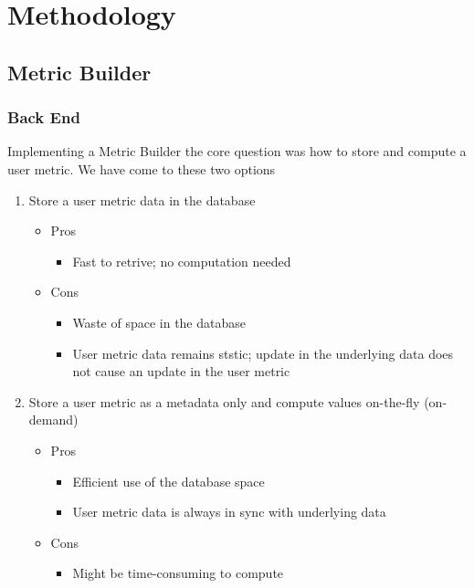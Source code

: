 \chapter{Methodology}

	\section{Metric Builder}

		\subsection{Back End}

			Implementing a Metric Builder the core question was how to store and compute a user metric.
			We have come to these two options

			\begin{enumerate}
				\item
					Store a user metric data in the database
					\begin{itemize}
						\item
							Pros
							\begin{itemize}
								\item
									Fast to retrive;
									no computation needed
							\end{itemize}
						\item
							Cons
							\begin{itemize}
								\item
									Waste of space in the database
								\item
									User metric data remains ststic;
									update in the underlying data does not cause an update in the user metric
							\end{itemize}
					\end{itemize}
				\item
					Store a user metric as a metadata only and compute values on-the-fly (on-demand)
					\begin{itemize}
						\item
							Pros
							\begin{itemize}
								\item
									Efficient use of the database space
								\item
									User metric data is always in sync with underlying data
							\end{itemize}
						\item
							Cons
							\begin{itemize}
								\item
									Might be time-consuming to compute
							\end{itemize}
					\end{itemize}
			\end{enumerate}


